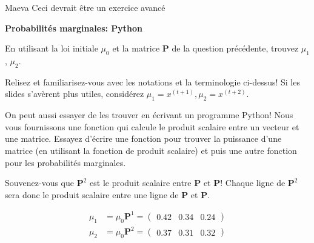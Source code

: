 \begin{note}{Maeva}
    Ceci devrait être un exercice avancé
\end{note}
\begin{Exercice}[10 minutes]\textbf{Probabilités marginales: Python}

En utilisant la loi initiale $\mu_0$ et la matrice \textbf{P} de la question précédente, trouvez $\mu_1$, $\mu_2$.

\begin{conseil}
    Relisez et familiarisez-vous avec les notations et la terminologie ci-dessus! Si les slides s'avèrent plus utiles, considérez $\mu_1 = x^{(t+1)}, \mu_2 = x^{(t+2)}$.
\end{conseil}

On peut aussi essayer de les trouver en écrivant un programme Python! Nous vous fournissons une fonction qui calcule le produit scalaire entre un vecteur et une matrice. Essayez d'écrire une fonction pour trouver la puissance d'une matrice (en utilisant la fonction de produit scalaire) et puis une autre fonction pour les probabilités marginales.



\begin{conseil}
    Souvenez-vous que $\mathbf{P}^2$ est le produit scalaire entre $\mathbf{P}$ et $\mathbf{P}$! Chaque ligne de  $\mathbf{P}^2$ sera donc le produit scalaire entre une ligne de $\mathbf{P}$ et $\mathbf{P}$.
\end{conseil}
\begin{solution}
\begin{align}
\mu_1 &= \mu_0 \mathbf{P}^1 =
\left(\begin{matrix}
0.42 & 0.34 & 0.24
\end{matrix}\right)\\
\mu_2 &= \mu_0 \mathbf{P}^2 =
\left(\begin{matrix}
0.37 & 0.31 & 0.32
\end{matrix}\right) 
\end{align}



\end{solution}

\end{Exercice}

